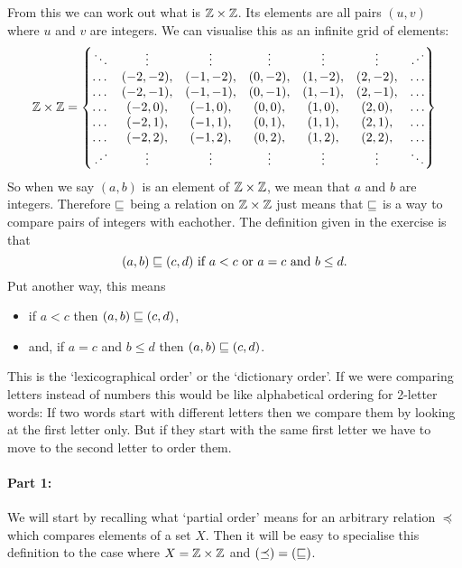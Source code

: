From this we can work out what is $\mathbb{Z} \times \mathbb{Z}$. Its elements are all pairs $(u, v)$ where $u$ and $v$ are integers. We can visualise this as an infinite grid of elements:
\[\mathbb{Z} \times \mathbb{Z} =
\begin{Bmatrix}
	\ddots & \vdots & \vdots & \vdots & \vdots & \vdots & \iddots \\
	\dots & (-2, -2), & (-1, -2), & (0, -2), & (1, -2), & (2, -2), & \dots \\
	\dots & (-2, -1), & (-1, -1), & (0, -1), & (1, -1), & (2, -1), & \dots \\
	\dots & (-2, 0), & (-1, 0), & (0, 0), & (1, 0), & (2, 0), & \dots \\
	\dots & (-2, 1), & (-1, 1), & (0, 1), & (1, 1), & (2, 1), & \dots \\
	\dots & (-2, 2), & (-1, 2), & (0, 2), & (1, 2), & (2, 2), & \dots \\
	\iddots & \vdots & \vdots & \vdots & \vdots & \vdots & \ddots
\end{Bmatrix}\]
So when we say $(a, b)$ is an element of $\mathbb{Z} \times \mathbb{Z}$, we mean that $a$ and $b$ are integers. Therefore $\sqsubseteq$ being a relation on $\mathbb{Z}\times \mathbb{Z}$ just means that $\sqsubseteq$ is a way to compare pairs of integers with eachother.
The definition given in the exercise is that
\[(a, b) \sqsubseteq (c, d) \text{ if } a < c \text{ or } a = c \text{ and } b \leq d.\]
Put another way, this means
\begin{itemize}
\item if $a < c$ then $(a, b) \sqsubseteq (c, d)$,
\item and, if $a = c$ and $b \leq d$ then $(a, b) \sqsubseteq (c, d)$.
\end{itemize}
This is the `lexicographical order' or the `dictionary order'. If we were comparing letters instead of numbers this would be like alphabetical ordering for 2-letter words: If two words start with different letters then we compare them by looking at the first letter only. But if they start with the same first letter we have to move to the second letter to order them.

\paragraph{Part 1:}
We will start by recalling what `partial order' means for an arbitrary relation $\preceq$ which compares elements of a set $X$. Then it will be easy to specialise this definition to the case where $X = \mathbb{Z} \times \mathbb{Z}$ and $(\preceq) = (\sqsubseteq)$.

